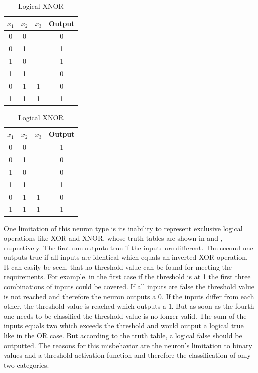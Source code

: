 \begin{table}[]
	\begin{subtable}{.5\textwidth}
		\centering
		\caption{Logical XOR}
		\label{tab:logical-xor}
		\begin{tabular}{ccc|c}
			\hline
			$x_1$ & $x_2$ & $x_3$ & Output 				\\ \hline
			0           & 0           &        & 0      \\
			0           & 1           &        & 1      \\
			1           & 0           &        & 1      \\
			1           & 1           &        & 0      \\ \hline
			0           & 1           & 1      & 0      \\
			1           & 1           & 1      & 1     
		\end{tabular}
	\end{subtable}%
	\begin{subtable}{.5\textwidth}
		\centering
		\caption{Logical XNOR}
		\label{tab:logical-xnor}
		\begin{tabular}{ccc|c}
			\hline
			$x_1$ & $x_2$ & $x_3$ & Output \\ \hline
			0           & 0           &             & 1      \\
			0           & 1           &             & 0      \\
			1           & 0           &             & 0      \\
			1           & 1           &             & 1      \\ \hline
			0           & 1           & 1           & 0      \\
			1           & 1           & 1           & 1     
		\end{tabular}
	\end{subtable}
\end{table}
One limitation of this neuron type is its inability to represent exclusive logical operations like XOR and XNOR\cite{Minsky69}, whose truth tables are shown in  and , respectively.
The first one outputs true if the inputs are different.
The second one outputs true if all inputs are identical which equals an inverted XOR operation.
It can easily be seen, that no threshold value can be found for meeting the requirements.
For example, in the first case if the threshold is at 1 the first three combinations of inputs could be covered.
If all inputs are false the threshold value is not reached and therefore the neuron outputs a 0.
If the inputs differ from each other, the threshold value is reached which outputs a 1.
But as soon as the fourth one needs to be classified the threshold value is no longer valid.
The sum of the inputs equals two which exceeds the threshold and would output a logical true like in the OR case.
But according to the truth table, a logical false should be outputted.
The reasons for this misbehavior are the neuron's limitation to binary values and a threshold activation function and therefore the classification of only two categories.

